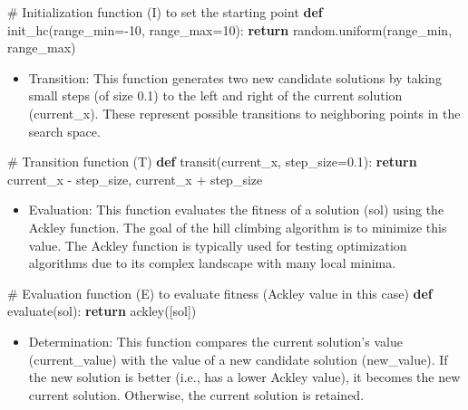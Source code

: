\documentclass[
  letterpaper,
  DIV=11,
  numbers=noendperiod]{scrreprt}
\newenvironment{Shaded}{\begin{snugshade}}{\end{snugshade}}
\newcommand{\CommentTok}[1]{\textcolor[rgb]{0.37,0.37,0.37}{#1}}
\newcommand{\ControlFlowTok}[1]{\textcolor[rgb]{0.00,0.23,0.31}{\textbf{#1}}}
\newcommand{\DecValTok}[1]{\textcolor[rgb]{0.68,0.00,0.00}{#1}}
\newcommand{\FloatTok}[1]{\textcolor[rgb]{0.68,0.00,0.00}{#1}}
\newcommand{\KeywordTok}[1]{\textcolor[rgb]{0.00,0.23,0.31}{\textbf{#1}}}
\newcommand{\NormalTok}[1]{\textcolor[rgb]{0.00,0.23,0.31}{#1}}
\newcommand{\OperatorTok}[1]{\textcolor[rgb]{0.37,0.37,0.37}{#1}}
\providecommand{\tightlist}{%
  \setlength{\itemsep}{0pt}\setlength{\parskip}{0pt}}\usepackage{longtable,booktabs,array}
\begin{document}
\begin{Shaded}
\begin{Highlighting}[]
\CommentTok{\# Initialization function (I) to set the starting point}
\KeywordTok{def}\NormalTok{ init\_hc(range\_min}\OperatorTok{={-}}\DecValTok{10}\NormalTok{, range\_max}\OperatorTok{=}\DecValTok{10}\NormalTok{):}
    \ControlFlowTok{return}\NormalTok{ random.uniform(range\_min, range\_max)}
\end{Highlighting}
\end{Shaded}

\begin{itemize}
\tightlist
\item
  Transition: This function generates two new candidate solutions by
  taking small steps (of size 0.1) to the left and right of the current
  solution (current\_x). These represent possible transitions to
  neighboring points in the search space.
\end{itemize}

\begin{Shaded}
\begin{Highlighting}[]
\CommentTok{\# Transition function (T)}
\KeywordTok{def}\NormalTok{ transit(current\_x, step\_size}\OperatorTok{=}\FloatTok{0.1}\NormalTok{):}
    \ControlFlowTok{return}\NormalTok{ current\_x }\OperatorTok{{-}}\NormalTok{ step\_size, current\_x }\OperatorTok{+}\NormalTok{ step\_size}
\end{Highlighting}
\end{Shaded}

\begin{itemize}
\tightlist
\item
  Evaluation: This function evaluates the fitness of a solution (sol)
  using the Ackley function. The goal of the hill climbing algorithm is
  to minimize this value. The Ackley function is typically used for
  testing optimization algorithms due to its complex landscape with many
  local minima.
\end{itemize}

\begin{Shaded}
\begin{Highlighting}[]
\CommentTok{\# Evaluation function (E) to evaluate fitness (Ackley value in this case)}
\KeywordTok{def}\NormalTok{ evaluate(sol):}
    \ControlFlowTok{return}\NormalTok{ ackley([sol])}
\end{Highlighting}
\end{Shaded}

\begin{itemize}
\tightlist
\item
  Determination: This function compares the current solution's value
  (current\_value) with the value of a new candidate solution
  (new\_value). If the new solution is better (i.e., has a lower Ackley
  value), it becomes the new current solution. Otherwise, the current
  solution is retained.
\end{itemize}
\end{document}
